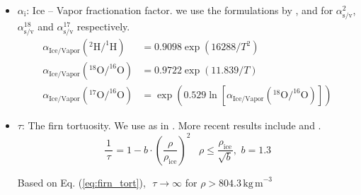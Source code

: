 \documentclass[11pt, draftcls, onecolumn]{IEEEtran} %
\numberwithin{equation}{section}
\numberwithin{table}{section}
\numberwithin{figure}{section}
\begin{document}
\begin{appendices}
\begin{itemize}
\item{$\alpha_{\mathrm{i}}$: Ice -- Vapor fractionation factor.  we use the formulations by \cite{Majoube1971},
	 \cite{Merlivat1967} and \cite{Barkan2005} for $\alpha_{\mathrm{s/v}}^{2}$, $\alpha_{\mathrm{s/v}}^{18}$ and $\alpha_{\mathrm{s/v}}^{17}$ respectively.
\begin{align}
\alpha_{\mathrm{Ice/Vapor}} \left(^{2}\mathrm{H}/^{1} \mathrm{H} \right) &=0.9098\exp(16288/T^2)\\
\alpha_{\mathrm{Ice/Vapor}} \left( ^{18}\mathrm{O}/^{16} \mathrm{O} \right) &=  0.9722\exp(11.839/T)\\
\alpha_{\mathrm{Ice/Vapor}} \left( ^{17}\mathrm{O}/^{16} \mathrm{O}\right)  & = \exp\left(0.529\ln\left[\alpha_{\mathrm{Ice/Vapor}} \left( ^{18}\mathrm{O}/^{16} \mathrm{O} \right)\right] \right)
\label{eq1617_ch4_app}
\end{align}}

\item{$\tau$: The firn tortuosity. We use \citet{Schwander1988} as in \cite{Johnsen2000}. More recent results include \citet{Freitag2002} and \citet{Adolph2014}.
\begin{equation}
\frac{\,1\,}{\,\tau\,} = 1 - b\cdot\left(\frac{\rho}{\rho_{\mathrm{ice}}}\right)^2 \,\,\,\,\,\rho \le 
\frac{\rho_{\mathrm{ice}}}{\sqrt{b}},\,\,b = 1.3
\label{eq:firn_tort}
\end{equation}

Based on Eq. (\ref{eq:firn_tort}), $\,\,\tau \rightarrow \infty$ for $\rho>804.3\,\mathrm{kg \, m}^{-3}$
}
	

\end{itemize}


\end{appendices}
\end{document}
